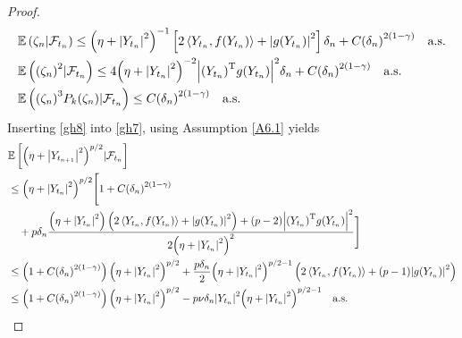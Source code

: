 \documentclass[preprint,12pt,compress]{elsarticle}
\begin{document}
\begin{proof}
\begin{equation}  \label{gh8}
\begin{split}
	&\mathbb{E}\left( {\zeta _n |{\mathcal{F}_{{t_n}}}} \right) \le {\left( {\eta + {{\left| {{Y_{{t_n}}}} \right|}^2}} \right)^{ - 1}}\left[ {2\left\langle {{Y_{{t_n}}},f({Y_{{t_n}}})} \right\rangle  + {{\left| {g({Y_{{t_n}}})} \right|}^2}} \right]\delta _n  + C{\left( {\delta _n } \right)^{2(1 - \gamma )}} \quad \text{a.s.} \\
	&\mathbb{E}\left( {{{\left( {\zeta _n } \right)}^2}|{\mathcal{F}_{{t_n}}}} \right) \le 4{\left( {\eta  + {{\left| {{Y_{{t_n}}}} \right|}^2}} \right)^{ - 2}}{\left| {{{({Y_{{t_n}}})}^{\rm T}}g({Y_{{t_n}}})} \right|^2}{\delta _n}  + C{\left( {\delta _n } \right)^{2(1 - \gamma )}} \quad \text{a.s.}  \\
	&\mathbb{E}\left( {{{\left( {\zeta _n } \right)}^3}{P_k}(\zeta _n )|{\mathcal{F}_{{t_n}}}} \right) \le C{\left( {\delta _n } \right)^{2(1 - \gamma )}} \quad \text{a.s.}
\end{split}
\end{equation}
Inserting \eqref{gh8} into \eqref{gh7}, using Assumption \ref{A6.1} yields
\begin{equation}  \label{gh9}
\begin{split}
	&\mathbb{E}\left[ {{{\left( {\eta + {{\left| {{Y_{{t_{n + 1}}}}} \right|}^2}} \right)}^{p/2}}|{\mathcal{F}_{{t_n}}}} \right] \\
	&\le {\left( {\eta + {{\left| {{Y_{{t_n}}}} \right|}^2}} \right)^{p/2}}\Bigg[ {1 + C{{\left( {\delta _n } \right)}^{2(1 - \gamma )}}}   \\
	& \quad+ p{\delta _n}\frac{{\left( {\eta  + {{\left| {{Y_{{t_n}}}} \right|}^2}} \right)\left( {2\left\langle {{Y_{{t_n}}},f({Y_{{t_n}}})} \right\rangle  + {{\left| {g({Y_{{t_n}}})} \right|}^2}} \right) + (p - 2){{\left| {{{({Y_{{t_n}}})}^{\rm T}}g({Y_{{t_n}}})} \right|}^2}}}{{2{{\left( {\eta  + {{\left| {{Y_{{t_n}}}} \right|}^2}} \right)}^2}}}\Bigg]  \\
	&\le \left( {1 + C{{\left( {\delta _n } \right)}^{2(1 - \gamma )}}} \right){\left( {\eta  + {{\left| {{Y_{{t_n}}}} \right|}^2}} \right)^{p/2}} + \frac{p\delta _n}{2} {\left( {\eta  + {{\left| {{Y_{{t_n}}}} \right|}^2}} \right)^{p/2 - 1}}\left( {2\left\langle {{Y_{{t_n}}},f({Y_{{t_n}}})} \right\rangle  + (p - 1){{\left| {g({Y_{{t_n}}})} \right|}^2}} \right) \\
	&\le \left( {1 + C{{\left( {\delta _n } \right)}^{2(1 - \gamma )}}} \right){\left( {\eta  + {{\left| {{Y_{{t_n}}}} \right|}^2}} \right)^{p/2}} - p\nu \delta _n {\left| {{Y_{{t_n}}}} \right|^2}{\left( {\eta  + {{\left| {{Y_{{t_n}}}} \right|}^2}} \right)^{p/2 - 1}} \quad \text{a.s.}

\end{split}
\end{equation}
\end{proof}
\end{document}
